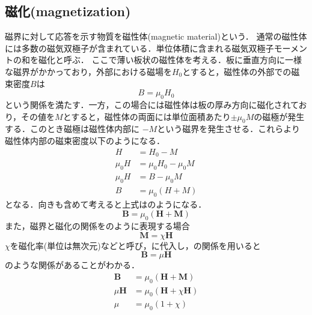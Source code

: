\subsection{磁化(magnetization)\cite{11302042}}
磁界に対して応答を示す物質を磁性体(magnetic material)という．
通常の磁性体には多数の磁気双極子が含まれている．単位体積に含まれる磁気双極子モーメントの和を磁化と呼ぶ．
ここで薄い板状の磁性体を考える．板に垂直方向に一様な磁界がかかっており，外部における磁場を$H_{0}$とすると，磁性体の外部での磁束密度$B$は
\begin{equation}	
	B=\mu_{0}H_{0}
\end{equation}
という関係を満たす．一方，この場合には磁性体は板の厚み方向に磁化されており，その値を$M$とすると，磁性体の両面には単位面積あたり$\pm \mu_{0}M$の磁極が発生する．このとき磁極は磁性体内部に
$-M$という磁界を発生させる．これらより磁性体内部の磁束密度以下のようになる．
\begin{align}
	H&=H_{0}-M\nonumber\\
	\mu_{0}H&=\mu_{0}H_{0}-\mu_{0}M\nonumber\\
	\mu_{0}H&=B-\mu_{0}M\nonumber\\
	B&=\mu_{0}(H+M)
\end{align}
となる．向きも含めて考えると上式はのようになる．
\begin{equation}
	\boldsymbol{B}=\mu_{0}(\boldsymbol{H}+\boldsymbol{M})
	\label{eq:mo}
\end{equation}
また，磁界と磁化の関係をのように表現する場合
\begin{equation}
	\boldsymbol{M}=\chi\boldsymbol{H}
	\label{eq:mmo}
\end{equation}
$\chi$を磁化率(単位は無次元)などと呼び，に代入し，の関係を用いると
\begin{equation}
	\boldsymbol{B}=\mu \boldsymbol{H}
	\label{eq:bh}
\end{equation}
のような関係があることがわかる．
\begin{align}
	\boldsymbol{B}&=\mu_{0}(\boldsymbol{H}+\boldsymbol{M})\nonumber\\
	\mu \boldsymbol{H}&=\mu_{0}(\boldsymbol{H}+\chi\boldsymbol{H})\nonumber\\
	\mu &=\mu_{0}(1+\chi)\label{eq:mu}
\end{align}

